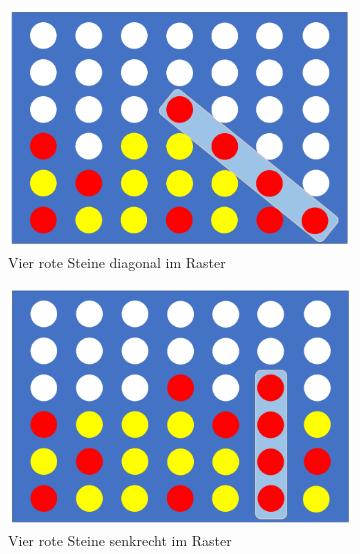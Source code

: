 \begin{figure}[H]
\begin{subfigure}{0.45\textwidth}
	\centering
	\includegraphics[width=\linewidth]{images/Diagonal}
	\caption[Vier rote Steine diagonal]{Vier rote Steine diagonal im Raster}
	\label{fig:diagonal}
\end{subfigure}\hfill
\begin{subfigure}{0.45\textwidth}
	\centering
	\includegraphics[width=\linewidth]{images/Senkrecht}
	\caption[Vier rote Steine in Reihe senkrecht]{Vier rote Steine senkrecht im Raster}
	\label{fig:senkrecht}
\end{subfigure}
\begin{subfigure}{0.45\textwidth}
	\centering

\end{subfigure}
\end{figure}
